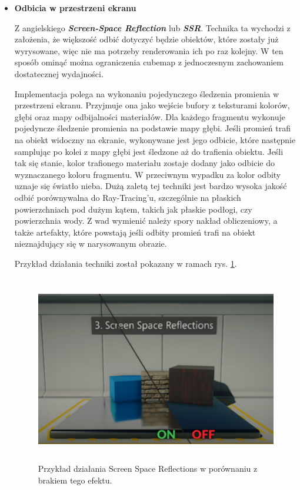 \begin{itemize}
	\item \textbf{Odbicia w przestrzeni ekranu}

	Z angielskiego \emph{\textbf{Screen-Space Reflection}} lub \emph{\textbf{SSR}}. Technika ta wychodzi z założenia, że większość odbić dotyczyć będzie obiektów, które zostały już wyrysowane, więc nie ma potrzeby renderowania ich po raz kolejny. W ten sposób ominąć można ograniczenia cubemap z jednoczesnym zachowaniem dostatecznej wydajności.

	Implementacja polega na wykonaniu pojedynczego śledzenia promienia w przestrzeni ekranu. Przyjmuje ona jako wejście bufory z teksturami kolorów, głębi oraz mapy odbijalności materiałów. Dla każdego fragmentu wykonuje pojedyncze śledzenie promienia na podstawie mapy głębi. Jeśli promień trafi na obiekt widoczny na ekranie, wykonywane jest jego odbicie, które następnie samplując po kolei z mapy głębi jest śledzone aż do trafienia obiektu. Jeśli tak się stanie, kolor trafionego materiału zostaje dodany jako odbicie do wyznaczanego koloru fragmentu. W przeciwnym wypadku za kolor odbity uznaje się światło nieba.
	Dużą zaletą tej techniki jest bardzo wysoka jakość odbić porównywalna do Ray-Tracing'u, szczególnie na płaskich powierzchniach pod dużym kątem, takich jak płaskie podłogi, czy powierzchnia wody. Z wad wymienić należy spory nakład obliczeniowy, a także artefakty, które powstają jeśli odbity promień trafi na obiekt nieznajdujący się w narysowanym obrazie.

	Przykład działania techniki został pokazany w ramach rys. \ref{intro-ssr}.

	\vfill
	\clearpage

	\begin{figure}[htbp]
		\centering
		\includegraphics[width=5.06667in,height=3.2316in]{images/11_screen_space_reflections.png}
		\caption{Przykład działania Screen Space Reflections w porównaniu z brakiem tego efektu. \cite{flaxengine:ssr:2024}}
		\label{intro-ssr}
	\end{figure}


\end{itemize}
